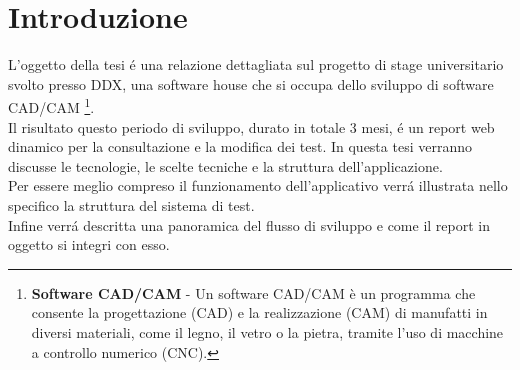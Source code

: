 \chapter{Introduzione}
    L'oggetto della tesi \'e una relazione dettagliata sul progetto di stage universitario svolto presso DDX,
    una software house che si occupa dello sviluppo di software CAD/CAM
    \footnote{\textbf{Software CAD/CAM} - Un software CAD/CAM è un programma che consente la progettazione (CAD)
    e la realizzazione (CAM) di manufatti in diversi materiali, come il legno, il vetro o la pietra, tramite 
    l'uso di macchine a controllo numerico (CNC).}.\\
    Il risultato questo periodo di sviluppo, durato in totale 3 mesi, \'e un report web dinamico per la consultazione e la modifica dei test. 
    In questa tesi verranno discusse le tecnologie, le scelte tecniche e la struttura dell'applicazione.\\

    Per essere meglio compreso il funzionamento dell'applicativo verr\'a illustrata nello specifico la struttura del sistema di test.\\
    Infine verr\'a descritta una panoramica del flusso di sviluppo e come il report in oggetto si integri con esso. 